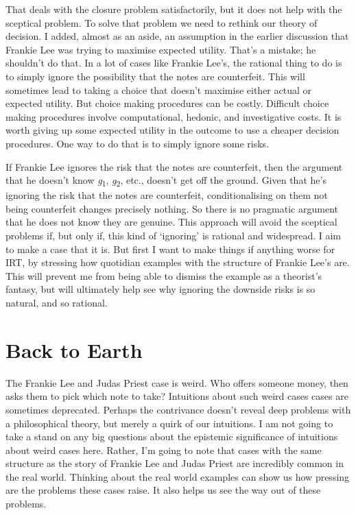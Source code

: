 \documentclass[
  10pt,
  letterpaper,
  twoside]{scrbook}
\begin{document}
That deals with the closure problem satisfactorily, but it does not help
with the sceptical problem. To solve that problem we need to rethink our
theory of decision. I added, almost as an aside, an assumption in the
earlier discussion that Frankie Lee was trying to maximise expected
utility. That's a mistake; he shouldn't do that. In a lot of cases like
Frankie Lee's, the rational thing to do is to simply ignore the
possibility that the notes are counterfeit. This will sometimes lead to
taking a choice that doesn't maximise either actual or expected utility.
But choice making procedures can be costly. Difficult choice making
procedures involve computational, hedonic, and investigative costs. It
is worth giving up some expected utility in the outcome to use a cheaper
decision procedures. One way to do that is to simply ignore some risks.

If Frankie Lee ignores the risk that the notes are counterfeit, then the
argument that he doesn't know \emph{g}\textsubscript{1},
\emph{g}\textsubscript{2}, etc., doesn't get off the ground. Given that
he's ignoring the risk that the notes are counterfeit, conditionalising
on them not being counterfeit changes precisely nothing. So there is no
pragmatic argument that he does not know they are genuine. This approach
will avoid the sceptical problems if, but only if, this kind of
`ignoring' is rational and widespread. I aim to make a case that it is.
But first I want to make things if anything worse for IRT, by stressing
how quotidian examples with the structure of Frankie Lee's are. This
will prevent me from being able to dismiss the example as a theorist's
fantasy, but will ultimately help see why ignoring the downside risks is
so natural, and so rational.

\section{Back to Earth}\label{sec-backearth}

The Frankie Lee and Judas Priest case is weird. Who offers someone
money, then asks them to pick which note to take? Intuitions about such
weird cases cases are sometimes deprecated. Perhaps the contrivance
doesn't reveal deep problems with a philosophical theory, but merely a
quirk of our intuitions. I am not going to take a stand on any big
questions about the epistemic significance of intuitions about weird
cases here. Rather, I'm going to note that cases with the same structure
as the story of Frankie Lee and Judas Priest are incredibly common in
the real world. Thinking about the real world examples can show us how
pressing are the problems these cases raise. It also helps us see the
way out of these problems.
\end{document}

